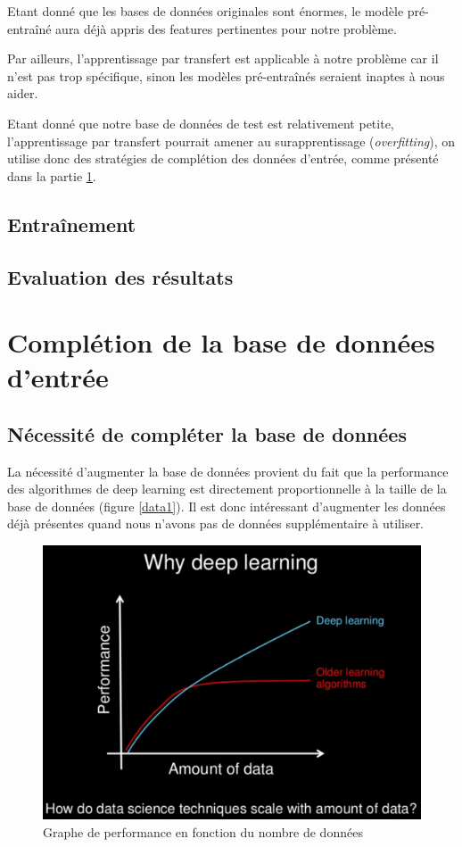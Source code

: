 \documentclass[a4paper,11pt]{article}
\begin{document}
Etant donné que les bases de données originales sont énormes, le modèle pré-entraîné aura déjà appris des features pertinentes pour notre problème.

Par ailleurs, l'apprentissage par transfert est applicable à notre problème car il n'est pas trop spécifique, sinon les modèles pré-entraînés seraient inaptes à nous aider.

Etant donné que notre base de données de test est relativement petite, l'apprentissage par transfert pourrait amener au surapprentissage (\textit{overfitting}), on utilise donc des stratégies de complétion des données d'entrée, comme présenté dans la partie \ref{sec:completion}.

\subsection{Entraînement}
\subsection{Evaluation des résultats}

\section{Complétion de la base de données d'entrée}
\label{sec:completion}
    
    \subsection{Nécessité de compléter la base de données}

	La nécessité d'augmenter la base de données provient du fait que la performance des
	algorithmes de deep learning est directement proportionnelle à la taille de la base de
	données (figure \ref{data1}). Il est donc intéressant d'augmenter les données déjà présentes
	quand nous n'avons pas de données supplémentaire à utiliser.

	\begin{figure}[H]
	    \centering
	    \includegraphics[scale=0.3]{deeplearning_data.png}
	    \caption{Graphe de performance en fonction du nombre de données}
	    \label{fig:data1}
	\end{figure}
\end{document}
